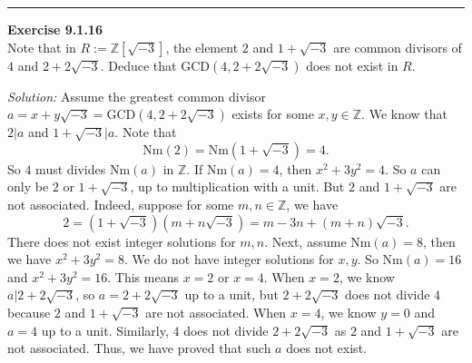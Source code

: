 \documentclass[a4paper, 12pt]{article}
\newenvironment{problem}[2][Exercise]
    { \begin{mdframed}[backgroundcolor=gray!20] \textbf{#1 #2} \\}
    {  \end{mdframed}}
\newenvironment{solution}
    {\textit{Solution:}}
    {}
\newcommand{\GCD}{\text{GCD}}
\newcommand{\Nm}{\text{Nm}}
\begin{document}
\noindent\rule{7in}{2.8pt}
\begin{problem}{9.1.16}
Note that in \(R:=\mathbb{Z}[\sqrt{-3}]\), the element \(2\) and \(1+\sqrt{-3}\) are common divisors of \(4\) and \(2+2\sqrt{-3}\). Deduce that \(\GCD(4,2+2\sqrt{-3})\) does not exist in \(R\). 
\end{problem}
\begin{solution}
Assume the greatest common divisor \(a=x+y\sqrt{-3}=\GCD(4,2+2\sqrt{-3})\) exists for some \(x,y\in \mathbb{Z}\). We know that \(2|a\) and \(1+\sqrt{-3}|a\). Note that 
\[\Nm(2)=\Nm(1+\sqrt{-3})=4.\]
So \(4\) must divides \(\Nm(a)\) in \(\mathbb{Z}\). If \(\Nm(a)=4\), then \(x^2+3y^2=4\). So \(a\) can only be \(2\) or \(1+\sqrt{-3}\), up to multiplication with a unit. But \(2\) and \(1+\sqrt{-3}\) are not associated. Indeed, suppose for some \(m,n\in \mathbb{Z}\), we have 
\[2=(1+\sqrt{-3})(m+n\sqrt{-3})=m-3n+(m+n)\sqrt{-3}.\]
There does not exist integer solutions for \(m,n\). Next, assume \(\Nm(a)=8\), then we have \(x^2+3y^2=8\). We do not have integer solutions for \(x,y\). So \(\Nm(a)=16\) and \(x^2+3y^2=16\). This means \(x=2\) or \(x=4\). When \(x=2\), we know \(a|2+2\sqrt{-3}\), so \(a=2+2\sqrt{-3}\) up to a unit, but \(2+2\sqrt{-3}\) does not divide \(4\) because \(2\) and 
\(1+\sqrt{-3}\) are not associated. When \(x=4\), we know \(y=0\) and \(a=4\) up to a unit. Similarly, \(4\) does not divide \(2+2\sqrt{-3}\) as \(2\) and \(1+\sqrt{-3}\) are not associated. Thus, we have proved that such \(a\) does not exist.
\end{solution}
\end{document}
